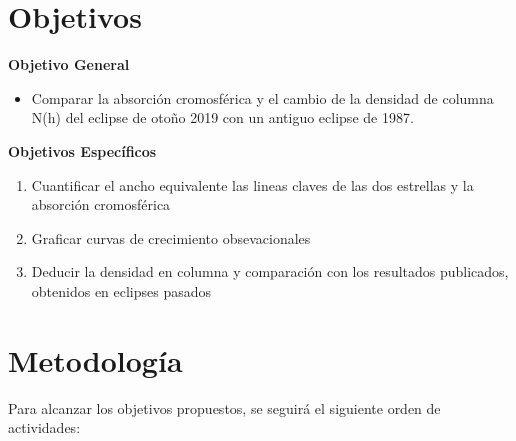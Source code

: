 \documentclass[11pt]{article}
\begin{document}
\section{Objetivos}

\textbf{Objetivo General}

\begin{itemize}
\item Comparar la absorción cromosférica y el cambio de la densidad de columna N(h) del eclipse de otoño 2019 con un antiguo eclipse de 1987.
\end{itemize}
\textbf{Objetivos Espec\'ificos}
\begin{enumerate}
    \item Cuantificar el ancho equivalente las lineas claves de las dos estrellas y la  absorción cromosférica

    \item Graficar curvas de crecimiento obsevacionales

    \item Deducir la densidad en columna y comparación 
con los resultados publicados, obtenidos en eclipses pasados
\end{enumerate}


\section{Metodolog\'ia}

Para alcanzar los objetivos propuestos, se seguirá el siguiente orden de actividades:
\end{document}
